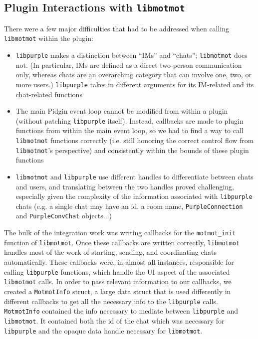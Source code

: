 \documentclass{sig-alternate}
\newcommand\libmotmot{\texttt{libmotmot}\xspace}
\newcommand\libpurple{\texttt{libpurple}\xspace}
\begin{document}

\subsection{Plugin Interactions with \libmotmot}
There were a few major difficulties that had to be addressed when calling
\libmotmot within the plugin:

\begin{itemize}
\item \libpurple makes a distinction between ``IMs'' and
``chats''; \libmotmot does not.  (In particular, IMs are defined as a direct two-person communication only, whereas chats are an overarching category that can involve one, two, or more users.) \libpurple takes in
different arguments for its IM-related and its chat-related functions

\item The main Pidgin event loop cannot be modified from within a plugin
(without patching \libpurple itself).  Instead, callbacks are made to plugin
functions from within the main event loop, so we had to find a way to call
\libmotmot functions correctly (i.e. still honoring the correct control flow
from \libmotmot's perspective) and consistently within the bounds of these
plugin functions

\item \libmotmot and \libpurple use different handles to differentiate between
chats and users, and translating between the two handles proved challenging,
especially given the complexity of the information associated with \libpurple
chats (e.g. a single chat may have an id, a room name, \verb`PurpleConnection`
and \verb`PurpleConvChat` objects...)

\end{itemize}

The bulk of the integration work was writing callbacks for the
\verb`motmot_init` function of \libmotmot.  Once these callbacks are written
correctly, \libmotmot handles most of the work of starting, sending, and
coordinating chats automatically.  These callbacks were, in almost all
instances, responsible for calling \libpurple functions, which handle the UI
aspect of the associated \libmotmot calls.  In order to pass relevant
information to our callbacks, we created a \verb`MotmotInfo` struct, a large
data struct that is used differently in different callbacks to get all the
necessary info to the \libpurple calls. \verb`MotmotInfo` contained the info
necessary to mediate between \libpurple and \libmotmot. It contained both the
id of the chat which was necessary for \libpurple and the opaque data handle
necessary for \libmotmot.
\end{document}

